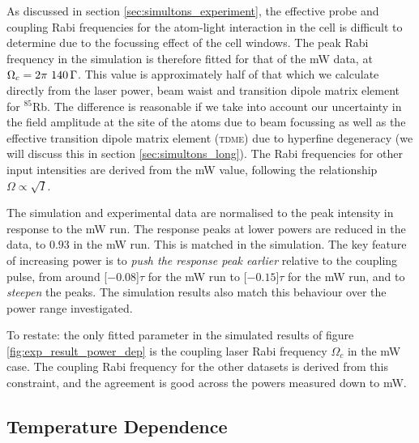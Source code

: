    As discussed in section \ref{sec:simultons_experiment}, the effective probe
    and coupling Rabi frequencies for the atom-light interaction in the cell is
    difficult to determine due to the focussing effect of the cell windows. The
    peak Rabi frequency in the simulation is therefore fitted for that of the
    \unit[100]{mW} data, at $\Omega_c = \unit[2\pi~140]{\Gamma}$.  This value is
    approximately half of that which we calculate directly from the laser power,
    beam waist and transition dipole matrix element for $^{85}$Rb. The
    difference is reasonable if we take into account our uncertainty in the
    field amplitude at the site of the atoms due to beam focussing as well as
    the effective transition dipole matrix element (\textsc{tdme}) due to
    hyperfine degeneracy (we will discuss this in section
    \ref{sec:simultons_long}). The Rabi frequencies for other input intensities
    are derived from the \unit[100]{mW} value, following the relationship
    $\Omega \propto \sqrt{I}$.

    The simulation and experimental data are normalised to the peak intensity in
    response to the \unit[100]{mW} run. The response peaks at lower powers are
    reduced in the data, to $0.93$ in the \unit[20]{mW} run. This is matched in
    the simulation. The key feature of increasing power is to \textit{push the
    response peak earlier} relative to the coupling pulse, from around
    \unit[$-0.08$]{$\tau$} for the \unit[20]{mW} run to \unit[$-0.15$]{$\tau$}
    for the \unit[100]{mW} run, and to \textit{steepen} the peaks. The
    simulation results also match this behaviour over the power range
    investigated.

     To restate: the only fitted parameter in the simulated results of figure
     \ref{fig:exp_result_power_dep} is the coupling laser Rabi frequency
     $\Omega_c$ in the \unit[100]{mW} case. The coupling Rabi frequency for the
     other datasets is derived from this constraint, and the agreement is good
     across the powers measured down to \unit[20]{mW}.

  \subsection{Temperature Dependence}

